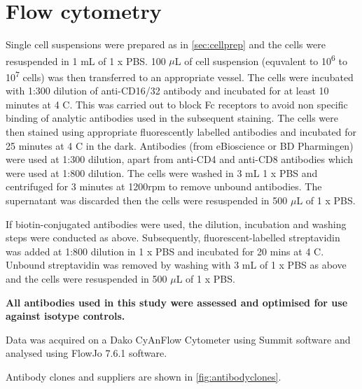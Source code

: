 \section{Flow cytometry}

Single cell suspensions were prepared as in \cref{sec:cellprep} and the cells were resuspended in 1 mL of 1 x PBS.
100 $\mu$L of cell suspension (equvalent to 10\textsuperscript{6} to 10\textsuperscript{7} cells) was then transferred to an appropriate vessel.
The cells were incubated with 1:300 dilution of anti-CD16/32 antibody and incubated for at least 10 minutes at 4 \textdegree C.
This was carried out to block Fc receptors to avoid non specific binding of analytic antibodies used in the subsequent staining.
The cells were then stained using appropriate fluorescently labelled antibodies and incubated for 25 minutes at 4 \textdegree C in the dark.
Antibodies (from eBioscience or BD Pharmingen) were used at 1:300 dilution, apart from anti-CD4 and anti-CD8 antibodies which were used at 1:800 dilution. 
The cells were washed in 3 mL 1 x PBS and centrifuged for 3 minutes at 1200rpm to remove unbound antibodies.
The supernatant was discarded then the cells were resuspended in 500 $\mu$L of 1 x PBS.

If biotin-conjugated antibodies were used, the dilution, incubation and washing steps were conducted as above.
Subsequently, fluorescent-labelled streptavidin was added at 1:800 dilution in 1 x PBS and incubated for 20 mins at 4 \textdegree C.
Unbound streptavidin was removed by washing with 3 mL of 1 x PBS as above and the cells were resuspended in 500 $\mu$L of 1 x PBS.


\textbf{All antibodies used in this study were assessed and optimised for use against isotype controls.}

Data was acquired on a Dako CyAn\texttrademark  Flow Cytometer using Summit software and analysed using FlowJo 7.6.1 software.

Antibody clones and suppliers are shown in \cref{fig:antibodyclones}. 

